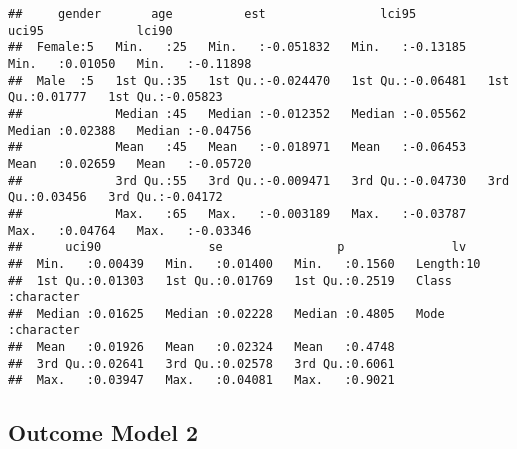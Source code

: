 \documentclass[
]{article}
\begin{document}
\begin{verbatim}
##     gender       age          est                lci95              uci95             lci90         
##  Female:5   Min.   :25   Min.   :-0.051832   Min.   :-0.13185   Min.   :0.01050   Min.   :-0.11898  
##  Male  :5   1st Qu.:35   1st Qu.:-0.024470   1st Qu.:-0.06481   1st Qu.:0.01777   1st Qu.:-0.05823  
##             Median :45   Median :-0.012352   Median :-0.05562   Median :0.02388   Median :-0.04756  
##             Mean   :45   Mean   :-0.018971   Mean   :-0.06453   Mean   :0.02659   Mean   :-0.05720  
##             3rd Qu.:55   3rd Qu.:-0.009471   3rd Qu.:-0.04730   3rd Qu.:0.03456   3rd Qu.:-0.04172  
##             Max.   :65   Max.   :-0.003189   Max.   :-0.03787   Max.   :0.04764   Max.   :-0.03346  
##      uci90               se                p               lv           
##  Min.   :0.00439   Min.   :0.01400   Min.   :0.1560   Length:10         
##  1st Qu.:0.01303   1st Qu.:0.01769   1st Qu.:0.2519   Class :character  
##  Median :0.01625   Median :0.02228   Median :0.4805   Mode  :character  
##  Mean   :0.01926   Mean   :0.02324   Mean   :0.4748                     
##  3rd Qu.:0.02641   3rd Qu.:0.02578   3rd Qu.:0.6061                     
##  Max.   :0.03947   Max.   :0.04081   Max.   :0.9021
\end{verbatim}

\hypertarget{outcome-model-2-4}{%
\subsection{Outcome Model 2}\label{outcome-model-2-4}}
\end{document}
